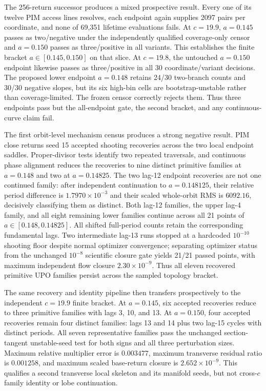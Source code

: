 The 256-return successor produces a mixed prospective result.  Every one of
its twelve PIM access lines resolves, each endpoint again supplies 2097 pairs
per coordinate, and none of 69,351 lifetime evaluations fails.  At $c=19.9$,
$a=0.145$ passes as two/negative under the independently qualified
coverage-only censor and $a=0.150$ passes as three/positive in all variants.
This establishes the finite bracket $a\in[0.145,0.150]$ on that slice.  At
$c=19.8$, the untouched $a=0.150$ endpoint likewise passes as three/positive
in all 30 coordinate/variant decisions.  The proposed lower endpoint
$a=0.148$ retains 24/30 two-branch counts and 30/30 negative slopes, but its
six high-bin cells are bootstrap-unstable rather than coverage-limited.  The
frozen censor correctly rejects them.  Thus three endpoints pass but the
all-endpoint gate, the second bracket, and any continuous-curve claim fail.

The first orbit-level mechanism census produces a strong negative result.
PIM close returns seed 15 accepted shooting recoveries across the two local
endpoint saddles.  Proper-divisor tests identify two repeated traversals, and
continuous phase alignment reduces the recoveries to nine distinct primitive
families at $a=0.148$ and two at $a=0.14825$.  The two lag-12 endpoint
recoveries are not one continued family: after independent continuation to
$a=0.148125$, their relative period difference is $1.7970\times10^{-3}$ and
their scaled whole-orbit RMS is $6092.16$, decisively classifying them as
distinct.  Both lag-12 families, the upper lag-4 family, and all eight
remaining lower families continue across all 21 points of
$a\in[0.148,0.14825]$.  All shifted full-period counts retain the corresponding
fundamental lags.  Two intermediate lag-13 runs stopped at a hardcoded
$10^{-10}$ shooting floor despite normal optimizer convergence; separating
optimizer status from the unchanged $10^{-8}$ scientific closure gate yields
21/21 passed points, with maximum independent flow closure
$2.30\times10^{-9}$.  Thus all eleven recovered primitive UPO families persist
across the sampled topology bracket.

The same recovery and identity pipeline then transfers prospectively to the
independent $c=19.9$ finite bracket.  At $a=0.145$, six accepted recoveries
reduce to three primitive families with lags 3, 10, and 13.  At $a=0.150$, four
accepted recoveries remain four distinct families: lags 13 and 14 plus two
lag-15 cycles with distinct periods.  All seven representative families pass
the unchanged section-tangent unstable-seed test for both signs and all three
perturbation sizes.  Maximum relative multiplier error is $0.003477$, maximum
transverse residual ratio is $0.001258$, and maximum scaled base-return closure
is $2.652\times10^{-9}$.  This qualifies a second transverse local skeleton
and its manifold seeds, but not cross-$c$ family identity or lobe continuation.

